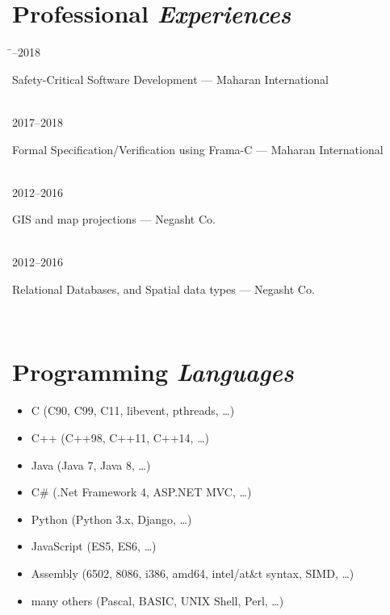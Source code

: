 \documentclass[a4paper,10pt]{article}
\newcommand{\follownote}[1]{--- {\footnotesize\color{darkblue}#1}}
\begin{document}
\section*{{\color{red}Professional \emph{Experiences}}}
\begin{tabbing}
\hspace{2.5cm}\=--2018 \>\parbox[t]{10.5cm}{
	Safety-Critical Software Development
	\follownote{Maharan International}
} \\[2mm]
2017--2018 \>\parbox[t]{10.5cm}{
	Formal Specification/Verification using Frama-C
	\follownote{Maharan International}
} \\[2mm]
2012--2016 \>\parbox[t]{10.5cm}{
	GIS and map projections
	\follownote{Negasht Co.}
} \\[2mm]
2012--2016 \>\parbox[t]{10.5cm}{
	Relational Databases, and Spatial data types
	\follownote{Negasht Co.}
} \\[2mm]
\end{tabbing}

\section*{{\color{purple}Programming \emph{Languages}}}
\begin{itemize}
	\item C (C90, C99, C11, libevent, pthreads, \ldots)
	\item C++ (C++98, C++11, C++14, \ldots)
	\item Java (Java 7, Java 8, \ldots)
	\item C\# (.Net Framework 4, ASP.NET MVC, \ldots)
	\item Python (Python 3.x, Django, \ldots)
	\item JavaScript (ES5, ES6, \ldots)
	\item Assembly (6502, 8086, i386, amd64, intel/at\&t syntax,
	    SIMD, \ldots)
	\item many others (Pascal, BASIC, UNIX Shell, Perl, \ldots)
\end{itemize}
\end{document}
